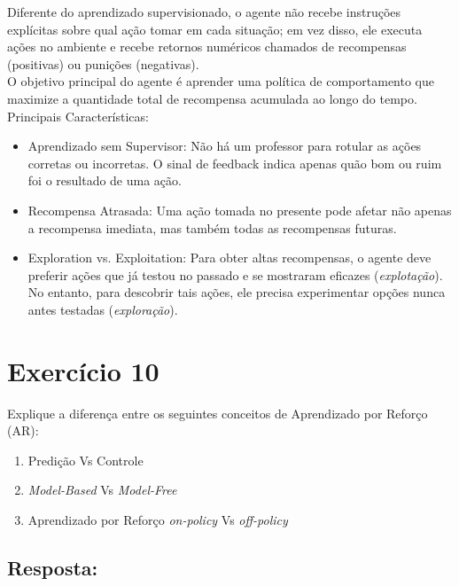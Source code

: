 \documentclass[a4paper,12pt]{article}
\begin{document}
Diferente do aprendizado supervisionado, o agente não recebe instruções explícitas sobre qual ação tomar em cada situação; em vez disso, ele executa ações no ambiente e recebe retornos numéricos chamados de recompensas (positivas) ou punições (negativas).\\

O objetivo principal do agente é aprender uma política de comportamento que maximize a quantidade total de recompensa acumulada ao longo do tempo.\\


Principais Características:\\

\begin{itemize}
	\item Aprendizado sem Supervisor: Não há um professor para rotular as ações corretas ou incorretas. O sinal de feedback indica apenas quão bom ou ruim foi o resultado de uma ação.
	\item Recompensa Atrasada: Uma ação tomada no presente pode afetar não apenas a recompensa imediata, mas também todas as recompensas futuras.
	\item Exploration vs. Exploitation: Para obter altas recompensas, o agente deve preferir ações que já testou no passado e se mostraram eficazes (\textit{explotação}). No entanto, para descobrir tais ações, ele precisa experimentar opções nunca antes testadas (\textit{exploração}).
\end{itemize}

\section*{Exercício 10}

Explique a diferença entre os seguintes conceitos de Aprendizado por Reforço (AR):

\begin{enumerate}[label=\alph*)]
	\item Predição Vs Controle
	\item \textit{Model-Based} Vs \textit{Model-Free}
	\item Aprendizado por Reforço \textit{on-policy} Vs \textit{off-policy}
\end{enumerate}


\subsection*{Resposta:}

\bigskip
\end{document}
